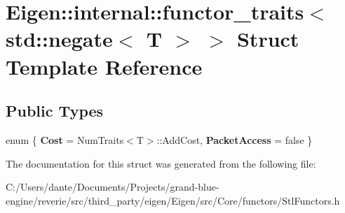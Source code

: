 \hypertarget{struct_eigen_1_1internal_1_1functor__traits_3_01std_1_1negate_3_01_t_01_4_01_4}{}\section{Eigen\+::internal\+::functor\+\_\+traits$<$ std\+::negate$<$ T $>$ $>$ Struct Template Reference}
\label{struct_eigen_1_1internal_1_1functor__traits_3_01std_1_1negate_3_01_t_01_4_01_4}
\subsection*{Public Types}
\begin{DoxyCompactItemize}
\item 
\mbox{\label{struct_eigen_1_1internal_1_1functor__traits_3_01std_1_1negate_3_01_t_01_4_01_4_aed2dee8fd18b1b35602a17e14878887c}} 
enum \{ {\bfseries Cost} = Num\+Traits$<$T$>$\+::Add\+Cost, 
{\bfseries Packet\+Access} = false
 \}
\end{DoxyCompactItemize}


The documentation for this struct was generated from the following file\+:\begin{DoxyCompactItemize}
\item 
C\+:/\+Users/dante/\+Documents/\+Projects/grand-\/blue-\/engine/reverie/src/third\+\_\+party/eigen/\+Eigen/src/\+Core/functors/Stl\+Functors.\+h\end{DoxyCompactItemize}
